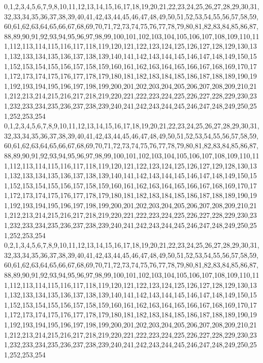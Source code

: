 \documentclass[12pt]{article}
\begin{document}
{0,1,2,3,4,5,6,7,9,8,10,11,12,13,14,15,16,17,18,19,20,21,22,23,24,25,26,27,28,29,30,31,32,33,34,35,36,37,38,39,40,41,42,43,44,45,46,47,48,49,50,51,52,53,54,55,56,57,58,59,60,61,62,63,64,65,66,67,68,69,70,71,72,73,74,75,76,77,78,79,80,81,82,83,84,85,86,87,88,89,90,91,92,93,94,95,96,97,98,99,100,101,102,103,104,105,106,107,108,109,110,111,112,113,114,115,116,117,118,119,120,121,122,123,124,125,126,127,128,129,130,131,132,133,134,135,136,137,138,139,140,141,142,143,144,145,146,147,148,149,150,151,152,153,154,155,156,157,158,159,160,161,162,163,164,165,166,167,168,169,170,171,172,173,174,175,176,177,178,179,180,181,182,183,184,185,186,187,188,189,190,191,192,193,194,195,196,197,198,199,200,201,202,203,204,205,206,207,208,209,210,211,212,213,214,215,216,217,218,219,220,221,222,223,224,225,226,227,228,229,230,231,232,233,234,235,236,237,238,239,240,241,242,243,244,245,246,247,248,249,250,251,252,253,254\\
0,1,2,3,4,5,6,7,8,9,10,11,12,13,14,15,16,17,18,19,20,21,22,23,24,25,26,27,28,29,30,31,32,33,34,35,36,37,38,39,40,41,42,43,44,45,46,47,48,49,50,51,52,53,54,55,56,57,58,59,60,61,62,63,64,65,66,67,68,69,70,71,72,73,74,75,76,77,78,79,80,81,82,83,84,85,86,87,88,89,90,91,92,93,94,95,96,97,98,99,100,101,102,103,104,105,106,107,108,109,110,111,112,113,114,115,116,117,118,119,120,121,122,123,124,125,126,127,129,128,130,131,132,133,134,135,136,137,138,139,140,141,142,143,144,145,146,147,148,149,150,151,152,153,154,155,156,157,158,159,160,161,162,163,164,165,166,167,168,169,170,171,172,173,174,175,176,177,178,179,180,181,182,183,184,185,186,187,188,189,190,191,192,193,194,195,196,197,198,199,200,201,202,203,204,205,206,207,208,209,210,211,212,213,214,215,216,217,218,219,220,221,222,223,224,225,226,227,228,229,230,231,232,233,234,235,236,237,238,239,240,241,242,243,244,245,246,247,248,249,250,251,252,253,254\\
0,2,1,3,4,5,6,7,8,9,10,11,12,13,14,15,16,17,18,19,20,21,22,23,24,25,26,27,28,29,30,31,32,33,34,35,36,37,38,39,40,41,42,43,44,45,46,47,48,49,50,51,52,53,54,55,56,57,58,59,60,61,62,63,64,65,66,67,68,69,70,71,72,73,74,75,76,77,78,79,80,81,82,83,84,85,86,87,88,89,90,91,92,93,94,95,96,97,98,99,100,101,102,103,104,105,106,107,108,109,110,111,112,113,114,115,116,117,118,119,120,121,122,123,124,125,126,127,128,129,130,131,132,133,134,135,136,137,138,139,140,141,142,143,144,145,146,147,148,149,150,151,152,153,154,155,156,157,158,159,160,161,162,163,164,165,166,167,168,169,170,171,172,173,174,175,176,177,178,179,180,181,182,183,184,185,186,187,188,189,190,191,192,193,194,195,196,197,198,199,200,201,202,203,204,205,206,207,208,209,210,211,212,213,214,215,216,217,218,219,220,221,222,223,224,225,226,227,228,229,230,231,232,233,234,235,236,237,238,239,240,241,242,243,244,245,246,247,248,249,250,251,252,253,254\\

}
\end{document}
